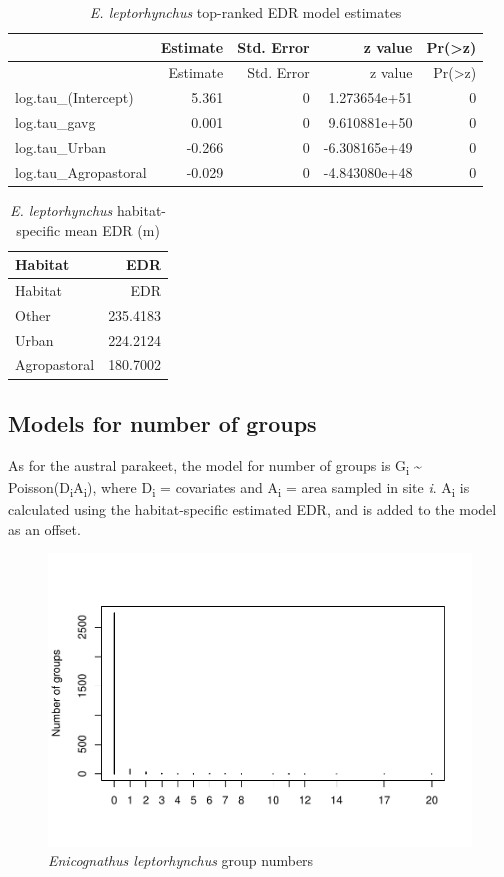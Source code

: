 \documentclass[]{article}
\begin{document}
\begin{longtable}[]{@{}lrrrr@{}}
\caption{\textit{E. leptorhynchus} top-ranked EDR model
estimates}\tabularnewline
\toprule
& Estimate & Std. Error & z value &
Pr(\textgreater{}\textbar{}z\textbar{})\tabularnewline
\midrule
\endfirsthead
\toprule
& Estimate & Std. Error & z value &
Pr(\textgreater{}\textbar{}z\textbar{})\tabularnewline
\midrule
\endhead
log.tau\_(Intercept) & 5.361 & 0 & 1.273654e+51 & 0\tabularnewline
log.tau\_gavg & 0.001 & 0 & 9.610881e+50 & 0\tabularnewline
log.tau\_Urban & -0.266 & 0 & -6.308165e+49 & 0\tabularnewline
log.tau\_Agropastoral & -0.029 & 0 & -4.843080e+48 & 0\tabularnewline
\bottomrule
\end{longtable}

\begin{longtable}[]{@{}lr@{}}
\caption{\textit{E. leptorhynchus} habitat-specific mean EDR
(m)}\tabularnewline
\toprule
Habitat & EDR\tabularnewline
\midrule
\endfirsthead
\toprule
Habitat & EDR\tabularnewline
\midrule
\endhead
Other & 235.4183\tabularnewline
Urban & 224.2124\tabularnewline
Agropastoral & 180.7002\tabularnewline
\bottomrule
\end{longtable}

\subsection{Models for number of
groups}\label{models-for-number-of-groups-1}

As for the austral parakeet, the model for number of groups is
G\textsubscript{i} \textasciitilde{}
Poisson(D\textsubscript{i}A\textsubscript{i}), where D\textsubscript{i}
= covariates and A\textsubscript{i} = area sampled in site \emph{i}.
A\textsubscript{i} is calculated using the habitat-specific estimated
EDR, and is added to the model as an offset.

\begin{figure}[H]
\includegraphics{Patagonia_parrots_density_analysis_files/figure-latex/unnamed-chunk-22-1} \caption{\textit{Enicognathus leptorhynchus} group numbers }\label{fig:unnamed-chunk-22}
\end{figure}
\end{document}
